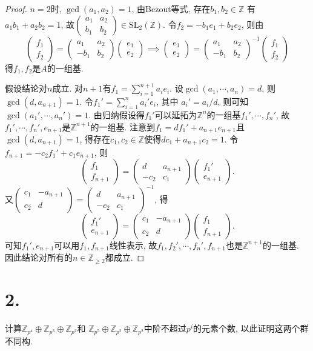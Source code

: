 \documentclass[12pt, a4paper, fontset=windows]{ctexart}
\newcommand{\Z}{\mathbb{Z}}
\newcommand{\SL}{\mathrm{SL}}
\def\pmat#1{\begin{pmatrix}#1\end{pmatrix}}
\begin{document}
\begin{proof}
$n=2$时, $\gcd(a_1,a_2)=1$, 由Bezout等式, 存在$b_1,b_2\in\Z$
有$a_1b_1+a_2b_2=1$, 故$\pmat{a_1&a_2\\b_1&b_2}\in\SL_2(\Z)$. 
令$f_2=-b_1e_1+b_2e_2$, 则由
\[\pmat{f_1\\f_2}=\pmat{a_1&a_2\\-b_1&b_2}\pmat{e_1\\e_2}\implies\pmat{e_1\\e_2}=\pmat{a_1&a_2\\-b_1&b_2}^{-1}\pmat{f_1\\f_2}\]
得$f_1,f_2$是$A$的一组基. 

假设结论对$n$成立. 对$n+1$有$f_1=\sum^{n+1}_{i=1}a_ie_i$. 
设$\gcd(a_1,\cdots,a_n)=d$, 则
$\gcd(d,a_{n+1})=1$. 令$f_1'=\sum^n_{i=1}a_i'e_i$, 其中
$a_i'=a_i/d$, 则可知$\gcd(a_1',\cdots,a_n')=1$. 
由归纳假设得$f_1'$可以延拓为$\Z^n$的一组基$f_1',\cdots,f_n'$, 
故$f_1',\cdots,f_n',e_{n+1}$是$\Z^{n+1}$的一组基. 
注意到$f_1=df_1'+a_{n+1}e_{n+1}$且$\gcd(d,a_{n+1})=1$, 
得存在$c_1,c_2\in\Z$使得$dc_1+a_{n+1}c_2=1$. 
令$f_{n+1}=-c_2f_1'+c_1e_{n+1}$, 则
\[\pmat{f_1\\f_{n+1}}=\pmat{d&a_{n+1}\\-c_2&c_1}\pmat{f_1'\\e_{n+1}}.\]
又$\pmat{c_1&-a_{n+1}\\c_2&d}=\pmat{d&a_{n+1}\\-c_2&c_1}^{-1}$, 得
\[\pmat{f_1'\\e_{n+1}}=\pmat{c_1&-a_{n+1}\\c_2&d}\pmat{f_1\\f_{n+1}}.\]
可知$f_1',e_{n+1}$可以用$f_1,f_{n+1}$线性表示, 
故$f_1,f_2',\cdots,f_n',f_{n+1}$也是$\Z^{n+1}$的一组基. 
因此结论对所有的$n\in\Z_{\ge 2}$都成立. 
\end{proof}

\section*{2.}

计算$\Z_{p^4}\oplus\Z_{p^3}\oplus\Z_{p^2}$和
$\Z_{p^5}\oplus\Z_{p^2}\oplus\Z_{p^2}$中阶不超过$p^i$的元素个数, 
以此证明这两个群不同构. 
\end{document}
